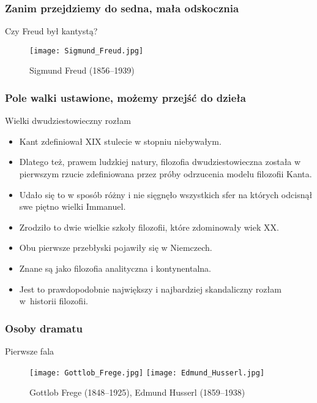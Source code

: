 \documentclass{beamer}  %
\begin{document}
\begin{frame}
  \frametitle{Zanim przejdziemy do sedna, mała odskocznia}

  \begin{block}{Czy Freud był kantystą?}
    \begin{figure}
      \centering

      \texttt{[image: Sigmund\_Freud.jpg]}
      \caption{Sigmund Freud (1856--1939)}
    \end{figure}
  \end{block}

\end{frame}



\begin{frame}
  \frametitle{Pole walki ustawione, możemy przejść do dzieła}

  \begin{block}{Wielki dwudziestowieczny rozłam}
    \pause
    \begin{itemize}
    \item Kant zdefiniował XIX stulecie w stopniu niebywałym.
    \item Dlatego też, prawem ludzkiej natury, filozofia
      dwudziestowieczna została w pierwszym rzucie zdefiniowana przez
      próby odrzucenia modelu filozofii Kanta.
    \item Udało się to w sposób różny i nie sięgnęło wszystkich sfer
      na których odcisnął swe piętno wielki Immanuel.
    \item Zrodziło to dwie wielkie szkoły filozofii, które zdominowały
      wiek XX.
    \item Obu pierwsze przebłyski pojawiły się w Niemczech.
    \item Znane są jako filozofia analityczna i kontynentalna.
    \item Jest to prawdopodobnie największy i najbardziej skandaliczny
      rozłam w~historii filozofii.
    \end{itemize}
  \end{block}

\end{frame}



\begin{frame}
  \frametitle{Osoby dramatu}
  \pause

  \begin{block}{Pierwsze fala}
    \begin{figure}
      \centering

      \texttt{[image: Gottlob\_Frege.jpg]}
      \texttt{[image: Edmund\_Husserl.jpg]}
      \caption{Gottlob Frege (1848--1925), Edmund Husserl
        (1859--1938)}
    \end{figure}
  \end{block}

\end{frame}
\end{document}
